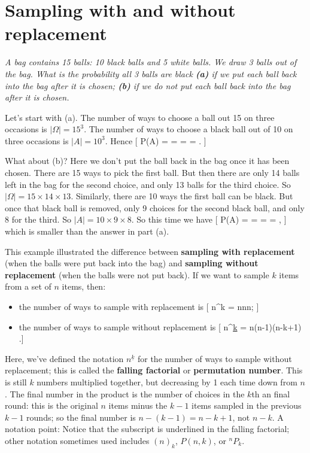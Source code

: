 \documentclass[
  letterpaper,
]{report}
\providecommand{\tightlist}{%
  \setlength{\itemsep}{0pt}\setlength{\parskip}{0pt}}\usepackage{longtable,booktabs,array}
\theoremstyle{definition}
\theoremstyle{definition}
\theoremstyle{remark}
\begin{document}
\hypertarget{sampling}{%
\section{Sampling with and without replacement}\label{sampling}}

\emph{A bag contains 15 balls: 10 black balls and 5 white balls. We draw
3 balls out of the bag. What is the probability all 3 balls are black
\textbf{(a)} if we put each ball back into the bag after it is chosen;
\textbf{(b)} if we do not put each ball back into the bag after it is
chosen.}

Let's start with (a). The number of ways to choose a ball out 15 on
three occasions is \(|\Omega| = 15^3\). The number of ways to choose a
black ball out of 10 on three occasions is \(|A| = 10^3\). Hence {[}
\mathbb P(A) =  =  =
 =  . {]}

What about (b)? Here we don't put the ball back in the bag once it has
been chosen. There are 15 ways to pick the first ball. But then there
are only 14 balls left in the bag for the second choice, and only 13
balls for the third choice. So \(|\Omega| = 15\times14\times13\).
Similarly, there are 10 ways the first ball can be black. But once that
black ball is removed, only 9 choices for the second black ball, and
only 8 for the third. So \(|A| = 10\times9\times8\). So this time we
have {[} \mathbb P(A) =  =
 =  =
 , {]} which is smaller than the answer in part
(a).

This example illustrated the difference between \textbf{sampling with
replacement} (when the balls were put back into the bag) and
\textbf{sampling without replacement} (when the balls were not put
back). If we want to sample \(k\) items from a set of \(n\) items, then:

\begin{itemize}
\tightlist
\item
  the number of ways to sample with replacement is {[} n\^{}k =
  n\times n\times\cdots\times n; {]}
\item
  the number of ways to sample without replacement is {[}
  {n}^{\underline{k}} = n\times(n-1)\times \cdots\times (n-k+1) .{]}
\end{itemize}

Here, we've defined the notation \({n}^{\underline{k}}\) for the number
of ways to sample without replacement; this is called the
\textbf{falling factorial} or \textbf{permutation number}. This is still
\(k\) numbers multiplied together, but decreasing by 1 each time down
from \(n\). The final number in the product is the number of choices in
the \(k\)th an final round: this is the original \(n\) items minus the
\(k-1\) items sampled in the previous \(k-1\) rounds; so the final
number is \(n - (k-1) = n - k + 1\), not \(n - k\). A notation point:
Notice that the subscript is underlined in the falling factorial; other
notation sometimes used includes \((n)_k\), \(P(n,k)\), or \({}^nP_k\).
\end{document}

